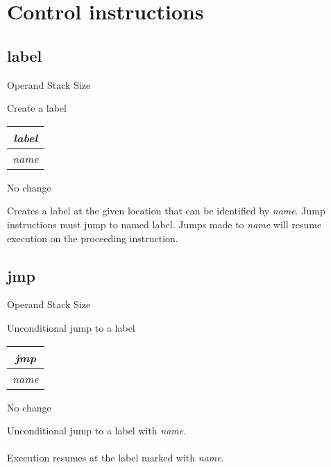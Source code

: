 \documentclass[12pt]{article}
\begin{document}
	\tableofcontents
	\newpage
	
	\section{Control instructions}
		\subsection*{label}
			\begin{labeling}{Operand Stack Size}
				\item [\textbf{Operation}] Create a label
				\item [\textbf{Format}] \begin{tabular}{| c |} \hline \textit{label} \\ \hline \textit{name} \\ \hline \end{tabular}
				\item [\textbf{Operand Stack}] No change
				\item [\textbf{Description}] 	Creates a label at the given location that can be identified by \textit{name}. Jump instructions must jump to named label. Jumps made to \textit{name} will resume execution on the proceeding instruction. 
			\end{labeling}
		\newpage 
		
		\subsection*{jmp}
			\begin{labeling}{Operand Stack Size}
				\item [\textbf{Operation}] Unconditional jump to a label
				\item [\textbf{Format}] \begin{tabular}{| c |} \hline \textit{jmp} \\ \hline \textit{name} \\ \hline \end{tabular}
				\item [\textbf{Operand Stack}] No change
				\item [\textbf{Description}] 	Unconditional jump to a label with \textit{name}. \\ \\ 
				Execution resumes at the label marked with \textit{name}.
			\end{labeling}
		\newpage
		
\end{document}
